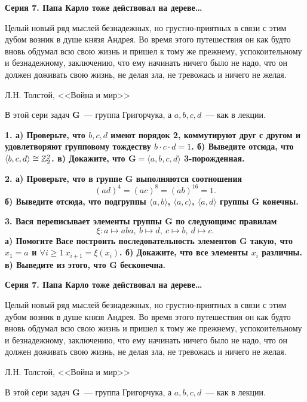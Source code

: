 \documentclass[11pt]{extarticle}
\begin{document}
	\begin{landscape}

	\pagestyle{empty}
	\begin{multicols}{2}

	\centerline{\bf{Серия 7. Папа Карло тоже действовал на дереве\ldots  }}

	\epigraph{Целый новый ряд мыслей безнадежных, но грустно-приятных в связи с этим дубом возник в душе князя Андрея. Во время этого путешествия он как будто вновь обдумал всю свою жизнь и пришел к тому же прежнему, успокоительному и безнадежному, заключению, что ему начинать ничего было не надо, что он должен доживать свою жизнь, не делая зла, не тревожась и ничего не желая.}{Л.Н. Толстой, <<Война и мир>>}

	В этой сери задач $\mathbf{G}$~--- группа Григорчука, а $a, b, c, d$~--- как в лекции. 

	\bf{1.} а) Проверьте, что $b, c, d$ имеют порядок 2, коммутируют друг с другом и удовлетворяют групповому тождеству  $b \cdot c \cdot d = 1$. б) Выведите отсюда, что $\langle b, c, d \rangle \cong \mathbb{Z}_{2}^2$. в) Докажите, что $\mathbf{G} = \langle a, b, c, d \rangle$ 3-порожденная. 
	
	\bf{2.} а) Проверьте, что в группе $\mathbf{G}$ выполняются соотношения 
	\[
		(ad)^4 = (ac)^8 = (ab)^{16} = 1.
	\]
	б) Выведите отсюда, что подгруппы $\langle a, b \rangle$, $\langle a, c \rangle$, $\langle a, d \rangle$ группы $\mathbf{G}$ конечны. 

	\bf{3.} Вася переписывает элементы группы $\mathbf{G}$ по следующимс правилам
	\[
		\xi\colon a \mapsto aba, \ b \mapsto d, \ c \mapsto b, \ d \mapsto c.
	\]
	а) Помогите Васе построить последовательность элементов $\mathbf{G}$ такую, что $x_1 = a$ и $\forall i \ge 1 \ x_{i + 1} = \xi(x_{i})$. б) Докажите, что все элементы $x_i$ различны. в) Выведите из этого, что  $\mathbf{G}$ бесконечна.

	\columnbreak

	\centerline{\bf{Серия 7. Папа Карло тоже действовал на дереве\ldots  }}

	\epigraph{Целый новый ряд мыслей безнадежных, но грустно-приятных в связи с этим дубом возник в душе князя Андрея. Во время этого путешествия он как будто вновь обдумал всю свою жизнь и пришел к тому же прежнему, успокоительному и безнадежному, заключению, что ему начинать ничего было не надо, что он должен доживать свою жизнь, не делая зла, не тревожась и ничего не желая.}{Л.Н. Толстой, <<Война и мир>>}

	В этой сери задач $\mathbf{G}$~--- группа Григорчука, а $a, b, c, d$~--- как в лекции. 


\end{multicols}
\end{landscape}
\end{document}
